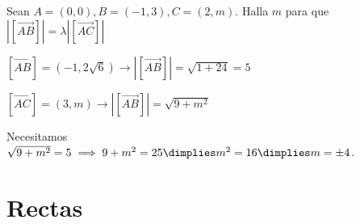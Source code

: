 \begin{problem}
Sean $A=(0,0),B=(-1,3),C=(2,m)$. Halla $m$ para que $|[\vec{AB}]| = λ|[\vec{AC}]|$
\solution

$[\vec{AB}] = (-1,2\sqrt{6}) \to |[\vec{AB}]| = \sqrt{1+24}=5$

$[\vec{AC}] = (3,m) \to |[\vec{AB}]| = \sqrt{9+m^2}$

Necesitamos $\sqrt{9+m^2} = 5 \implies 9+m^2 = 25 \dimplies m^2=16 \dimplies m=\pm4$.

\end{problem}


\section{Rectas}







